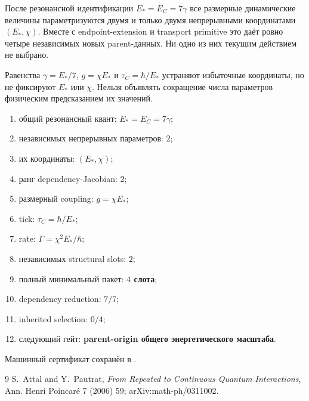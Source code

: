 \begin{theorem}
После резонансной идентификации $E_*=E_C=7\gamma$ все размерные динамические
величины параметризуются двумя и только двумя непрерывными координатами
$(E_*,\chi)$. Вместе с endpoint-extension и transport primitive это даёт
ровно четыре независимых новых parent-данных. Ни одно из них текущим
действием не выбрано.
\end{theorem}

\begin{nogocriterion}
Равенства $\gamma=E_*/7$, $g=\chi E_*$ и
$\tau_C=\hbar/E_*$ устраняют избыточные координаты, но не фиксируют
$E_*$ или $\chi$. Нельзя объявлять сокращение числа параметров физическим
предсказанием их значений.
\end{nogocriterion}

\begin{protocol}\begin{enumerate}
\item общий резонансный квант: \textbf{$E_*=E_C=7\gamma$};
\item независимых непрерывных параметров: \textbf{$2$};
\item их координаты: \textbf{$(E_*,\chi)$};
\item ранг dependency-Jacobian: \textbf{$2$};
\item размерный coupling: \textbf{$g=\chi E_*$};
\item tick: \textbf{$\tau_C=\hbar/E_*$};
\item rate: \textbf{$\Gamma=\chi^2E_*/\hbar$};
\item независимых structural slots: \textbf{$2$};
\item полный минимальный пакет: \textbf{$4$ слота};
\item dependency reduction: \textbf{$7/7$};
\item inherited selection: \textbf{$0/4$};
\item следующий гейт: \textbf{parent-origin общего энергетического масштаба}.
\end{enumerate}\end{protocol}

Машинный сертификат сохранён в
.

\begin{thebibliography}{9}
 S.~Attal and Y.~Pautrat,
\emph{From Repeated to Continuous Quantum Interactions},
Ann. Henri Poincar\'e 7 (2006) 59; arXiv:math-ph/0311002.
\end{thebibliography}